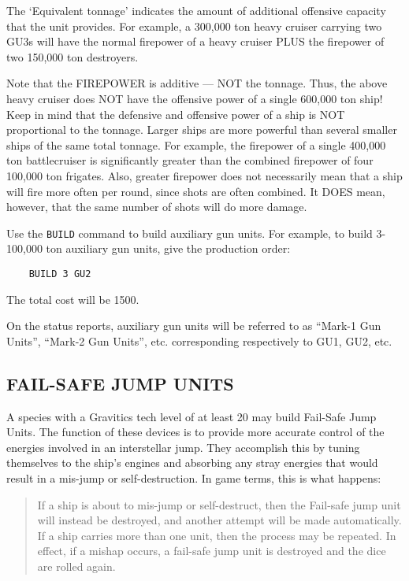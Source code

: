 \documentclass[10pt,titlepage]{article}
\begin{document}
The `Equivalent tonnage' indicates the amount of additional offensive capacity
that the unit provides.  For example, a 300,000 ton heavy cruiser carrying two
GU3s will have the normal firepower of a heavy cruiser PLUS the firepower of
two 150,000 ton destroyers.

\begin{informationnote}
Note that the FIREPOWER is additive --- NOT the tonnage.  Thus, the above
heavy cruiser does NOT have the offensive power of a single 600,000 ton
ship!  Keep in mind that the defensive and offensive power of a ship is NOT
proportional to the tonnage.  Larger ships are more powerful than several
smaller ships of the same total tonnage.  For example, the firepower of a
single 400,000 ton battlecruiser is significantly greater than the combined
firepower of four 100,000 ton frigates.  Also, greater firepower does not
necessarily mean that a ship will fire more often per round, since shots are
often combined.  It DOES mean, however, that the same number of shots will
do more damage.
\end{informationnote}

Use the \texttt{BUILD} command to build auxiliary gun units.  For example, to build
3-100,000 ton auxiliary gun units, give the production order:

\begin{verbatim}
	BUILD 3 GU2\end{verbatim} 

The total cost will be 1500.

On the status reports, auxiliary gun units will be referred to as ``Mark-1 Gun
Units'', ``Mark-2 Gun Units'', etc. corresponding respectively to GU1, GU2, etc.

\subsection{FAIL-SAFE JUMP UNITS}

A species with a Gravitics tech level of at least 20 may build Fail-Safe Jump
Units.  The function of these devices is to provide more accurate control of
the energies involved in an interstellar jump.  They accomplish this by tuning
themselves to the ship's engines and absorbing any stray energies that would
result in a mis-jump or self-destruction.  In game terms, this is what happens:

\begin{quotation}
	If a ship is about to mis-jump or self-destruct, then the
	Fail-safe jump unit will instead be destroyed, and another
	attempt will be made automatically.  If a ship carries more
	than one unit, then the process may be repeated.  In effect,
	if a mishap occurs, a fail-safe jump unit is destroyed and
	the dice are rolled again.\end{quotation} 
\end{document}
